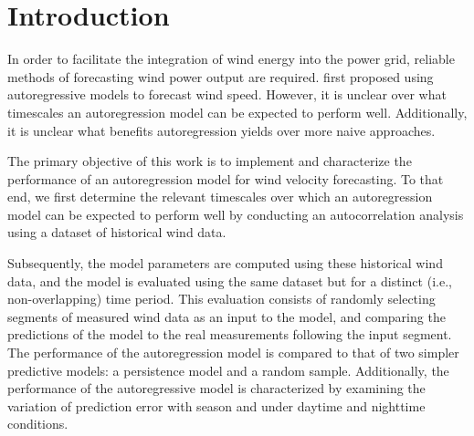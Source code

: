 \documentclass[11pt, oneside]{article}
\begin{document}
\newpage


\section{Introduction}
In order to facilitate the integration of wind energy into the power grid, reliable methods of forecasting wind power output are required.
\citet{Brown1984} first proposed using autoregressive models to forecast wind speed.
However, it is unclear over what timescales an autoregression model can be expected to perform well.
Additionally, it is unclear what benefits autoregression yields over more naive approaches.

The primary objective of this work is to implement and characterize the performance of an autoregression model for wind velocity forecasting.
To that end, we first determine the relevant timescales over which an autoregression model can be expected to perform well by conducting an autocorrelation analysis using a dataset of historical wind data.

Subsequently, the model parameters are computed using these historical wind data, and the model is evaluated using the same dataset but for a distinct (i.e., non-overlapping) time period.
This evaluation consists of randomly selecting segments of measured wind data as an input to the model, and comparing the predictions of the model to the real measurements following the input segment.
The performance of the autoregression model is compared to that of two simpler predictive models: a persistence model and a random sample.
Additionally, the performance of the autoregressive model is characterized by examining the variation of prediction error with season and under daytime and nighttime conditions.
\end{document}
